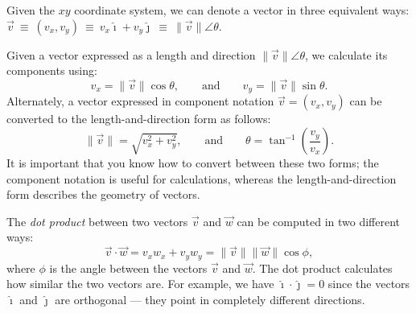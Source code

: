 \documentclass[letterpaper,9pt,journal]{IEEEtran}
\begin{document}
Given the $xy$ coordinate system, we can denote a vector in three equivalent ways:
$
  \vec{v}  
  \ \equiv \ (v_x,v_y)
  \ \equiv \  v_x\hat{\imath} + v_y\hat{\jmath} 
  \ \equiv \ 
  \|\vec{v}\| \angle \theta
$.

Given a vector expressed as a length and direction $\|\vec{v}\| \angle \theta$,
we calculate its components using:
\[
  v_x = \|\vec{v}\| \cos\theta, \qquad \text{and} \qquad   v_y = \|\vec{v}\|\sin\theta.
\]
Alternately, a vector expressed in component notation $\vec{v}=(v_x,v_y)$ 
can be converted to the length-and-direction form as follows:
\[
 \|\vec{v}\|  = \sqrt{ v_x^2 + v_y^2 }, \qquad \text{and} \qquad \theta = \tan^{-1}\!\left( \frac{ v_{y} }{ v_{x} } \right).
\]
It is important that you know how to convert between these two forms;
the component notation is useful for calculations, 
whereas the length-and-direction form describes the geometry of vectors.


The \emph{dot product} between two vectors $\vec{v}$ and $\vec{w}$ 
can be  computed in two different ways:
\[
 \vec{v}\cdot\vec{w} = v_xw_x + v_yw_y = \|\vec{v}\| \|\vec{w}\| \cos\phi,
\]
where $\phi$ is the angle between the vectors $\vec{v}$ and $\vec{w}$.
The dot product calculates how similar the two vectors are.
For example, we have $\hat{\imath} \cdot \hat{\jmath} =0$
since the vectors $\hat{\imath}$ and $\hat{\jmath}$ are orthogonal --- they point in completely different directions.
%






%
\end{document}
